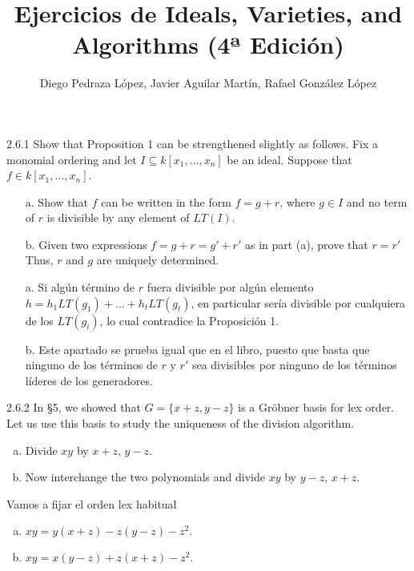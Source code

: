 \documentclass[twoside]{article}
\begin{document}
\title{Ejercicios de Ideals, Varieties, and Algorithms (4ª Edición)}
\author{Diego Pedraza López, Javier Aguilar Martín, Rafael González López}
\maketitle

\begin{ejercicio}{2.6.1}
Show that Proposition 1 can be strengthened slightly as follows. Fix a monomial ordering
and let $I ⊆ k[x_1,\dots , x_n]$ be an ideal. Suppose that $f ∈ k[x_1,\dots , x_n]$.
\begin{enumerate}
\item[a.] Show that $f$ can be written in the form $f = g + r$, where $g ∈ I$ and no term of $r$ is
divisible by any element of $LT(I)$.
\item[b.] Given two expressions $f = g + r = g'
+ r'$ as in part (a), prove that $r = r'$ Thus, $r$
and $g$ are uniquely determined.
\end{enumerate}
\end{ejercicio}

\begin{solucion}
\begin{enumerate}
\item[]
\item[a.] Si algún término de $r$ fuera divisible por algún elemento $h=h_1LT(g_1)+\dots+h_tLT(g_t)$, en particular sería divisible por cualquiera de los $LT(g_i)$, lo cual contradice la Proposición 1.

\item[b.] Este apartado se prueba igual que en el libro, puesto que basta que ninguno de los términos de $r$ y $r'$ sea divisibles por ninguno de los términos líderes de los generadores.
\end{enumerate}
\end{solucion}

\newpage

\begin{ejercicio}{2.6.2}
In §5, we showed that $G = \{x + z, y − z\}$ is a Gröbner basis for lex order. Let us use
this basis to study the uniqueness of the division algorithm.
\begin{enumerate}[a.]
\item Divide $xy$ by $x + z$, $y − z$.
\item Now interchange the two polynomials and divide $xy$ by $y − z$, $x + z$.
\end{enumerate}
\end{ejercicio}
\begin{solucion}
Vamos a fijar el orden lex habitual
\begin{enumerate}[a.]
\item $xy=y(x+z)-z(y-z)-z^2.$
\item $xy=x(y-z)+z(x+z)-z^2.$
\end{enumerate}
\end{solucion}
\newpage
\end{document}
